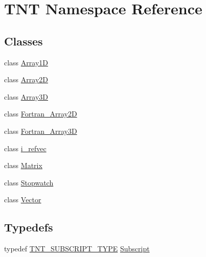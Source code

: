 \hypertarget{namespaceTNT}{}\section{T\+NT Namespace Reference}
\label{namespaceTNT}
\subsection*{Classes}
\begin{DoxyCompactItemize}
\item 
class \hyperlink{classTNT_1_1Array1D}{Array1D}
\item 
class \hyperlink{classTNT_1_1Array2D}{Array2D}
\item 
class \hyperlink{classTNT_1_1Array3D}{Array3D}
\item 
class \hyperlink{classTNT_1_1Fortran__Array2D}{Fortran\+\_\+\+Array2D}
\item 
class \hyperlink{classTNT_1_1Fortran__Array3D}{Fortran\+\_\+\+Array3D}
\item 
class \hyperlink{classTNT_1_1i__refvec}{i\+\_\+refvec}
\item 
class \hyperlink{classTNT_1_1Matrix}{Matrix}
\item 
class \hyperlink{classTNT_1_1Stopwatch}{Stopwatch}
\item 
class \hyperlink{classTNT_1_1Vector}{Vector}
\end{DoxyCompactItemize}
\subsection*{Typedefs}
\begin{DoxyCompactItemize}
\item 
typedef \hyperlink{tnt__subscript_8h_ae204fca2c823f77ee865da86d3bf53d0}{T\+N\+T\+\_\+\+S\+U\+B\+S\+C\+R\+I\+P\+T\+\_\+\+T\+Y\+PE} \hyperlink{namespaceTNT_af22e3f1460e145c04ce4e7d701e4c1c1}{Subscript}
\end{DoxyCompactItemize}
